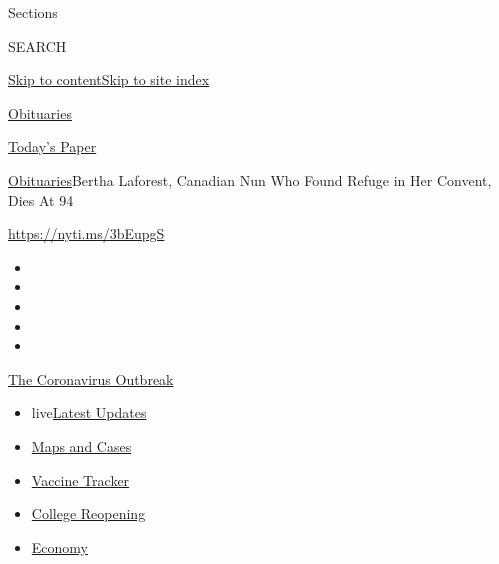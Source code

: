 Sections

SEARCH

\protect\hyperlink{site-content}{Skip to
content}\protect\hyperlink{site-index}{Skip to site index}

\href{https://www.nytimes.com/section/obituaries}{Obituaries}

\href{https://myaccount.nytimes.com/auth/login?response_type=cookie\&client_id=vi}{}

\href{https://www.nytimes.com/section/todayspaper}{Today's Paper}

\href{/section/obituaries}{Obituaries}\textbar{}Bertha Laforest,
Canadian Nun Who Found Refuge in Her Convent, Dies At 94

\url{https://nyti.ms/3bEupgS}

\begin{itemize}
\item
\item
\item
\item
\item
\end{itemize}

\href{https://www.nytimes.com/news-event/coronavirus?action=click\&pgtype=Article\&state=default\&region=TOP_BANNER\&context=storylines_menu}{The
Coronavirus Outbreak}

\begin{itemize}
\tightlist
\item
  live\href{https://www.nytimes.com/2020/08/03/world/coronavirus-covid-19.html?action=click\&pgtype=Article\&state=default\&region=TOP_BANNER\&context=storylines_menu}{Latest
  Updates}
\item
  \href{https://www.nytimes.com/interactive/2020/us/coronavirus-us-cases.html?action=click\&pgtype=Article\&state=default\&region=TOP_BANNER\&context=storylines_menu}{Maps
  and Cases}
\item
  \href{https://www.nytimes.com/interactive/2020/science/coronavirus-vaccine-tracker.html?action=click\&pgtype=Article\&state=default\&region=TOP_BANNER\&context=storylines_menu}{Vaccine
  Tracker}
\item
  \href{https://www.nytimes.com/2020/08/02/us/covid-college-reopening.html?action=click\&pgtype=Article\&state=default\&region=TOP_BANNER\&context=storylines_menu}{College
  Reopening}
\item
  \href{https://www.nytimes.com/live/2020/08/03/business/stock-market-today-coronavirus?action=click\&pgtype=Article\&state=default\&region=TOP_BANNER\&context=storylines_menu}{Economy}
\end{itemize}

